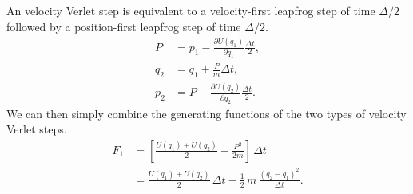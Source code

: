 \documentclass[aip,jcp,preprint,notitlepage, superscriptaddress]{revtex4-1}
\begin{document}
An velocity Verlet step is equivalent to
a velocity-first leapfrog step of time $\Delta/2$
followed by
a position-first leapfrog step of time $\Delta/2$.
%
\begin{equation}
\begin{aligned}
P     &= p_1 - \frac{ \partial U(q_1) } { \partial q_1 } \frac{ \Delta t }{ 2 }, \\
q_2   &= q_1 + \frac{P}{m} \Delta t, \\
p_2   &= P - \frac{ \partial U(q_2) } { \partial q_2 } \frac{ \Delta t } { 2 }.
\end{aligned}
\end{equation}
%
We can then simply combine the generating functions
of the two types of velocity Verlet steps.
$$
\begin{aligned}
F_1
&=
\left[
\frac{ U(q_1) + U(q_2) } { 2 }
- \frac{ P^2 }{ 2 m }
\right] \, \Delta t \\
&=
\frac{ U(q_1) + U(q_2) } { 2 } \, \Delta t
- \frac{1}{2} \, m \, \frac{ (q_2 - q_1)^2 }{ \Delta t }.
\end{aligned}
$$




\end{document}
